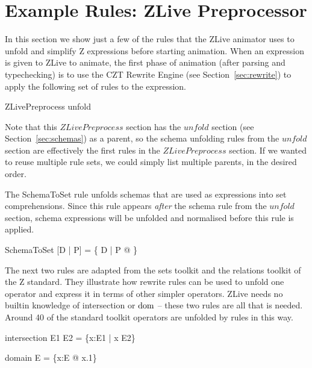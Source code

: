 \documentclass{entcs}
\begin{document}
\section{Example Rules: ZLive Preprocessor} \label{sec:zlive}

In this section we show just a few of the rules that the ZLive
animator uses to unfold and simplify Z expressions before starting
animation.  When an expression is given to ZLive to animate, the first
phase of animation (after parsing and typechecking) is to use the CZT
Rewrite Engine (see Section~\ref{sec:rewrite}) to apply the following
set of rules to the expression.

\begin{zsection}
  \SECTION ZLivePreprocess \parents unfold
\end{zsection}

Note that this $ZLivePreprocess$ section has the $unfold$ section (see
Section~\ref{sec:schemas}) as a parent, so the schema unfolding rules
from the $unfold$ section are effectively the first rules in the
$ZLivePreprocess$ section.  If we wanted to reuse multiple rule sets,
we could simply list multiple parents, in the desired order.

The SchemaToSet rule unfolds schemas that are used as expressions into
set comprehensions.  Since this rule appears \emph{after} the schema
rule from the $unfold$ section, schema expressions will be unfolded
and normalised before this rule is applied. 
\begin{zedrule}{SchemaToSet}
[D | P] = \{ D | P @ \theta [D | true] \}
\end{zedrule}

The next two rules are adapted from the sets toolkit and the
relations toolkit of the Z standard.  They illustrate how rewrite rules
can be used to unfold one operator and express it in terms of other
simpler operators.  ZLive needs no builtin knowledge of intersection
or $\mathop{\mathstrut{\mbox{\textrm{dom}}}}\nolimits$ -- these two rules are all that is needed.  Around 40 of the
standard toolkit operators are unfolded by rules in this way.

\begin{zedrule}{intersection}
   E1 \cap E2 = \{x:E1 | x \in E2\}
\end{zedrule}
\begin{zedrule}{domain}
   \dom E = \{x:E @ x.1\}
\end{zedrule}
\end{document}
